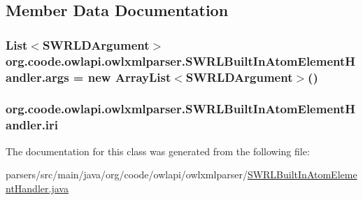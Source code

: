 \subsection{Member Data Documentation}
\hypertarget{classorg_1_1coode_1_1owlapi_1_1owlxmlparser_1_1_s_w_r_l_built_in_atom_element_handler_ac74494af9ceb2e319fe9324276b621ed}{
\subsubsection[{args}]{\setlength{\rightskip}{0pt plus 5cm}List$<${\bf S\-W\-R\-L\-D\-Argument}$>$ org.\-coode.\-owlapi.\-owlxmlparser.\-S\-W\-R\-L\-Built\-In\-Atom\-Element\-Handler.\-args = new Array\-List$<${\bf S\-W\-R\-L\-D\-Argument}$>$()\hspace{0.3cm}{\ttfamily [private]}}}\label{classorg_1_1coode_1_1owlapi_1_1owlxmlparser_1_1_s_w_r_l_built_in_atom_element_handler_ac74494af9ceb2e319fe9324276b621ed}
\hypertarget{classorg_1_1coode_1_1owlapi_1_1owlxmlparser_1_1_s_w_r_l_built_in_atom_element_handler_a6b824f220057039e141f070bd6705e22}{
\subsubsection[{iri}]{ org.\-coode.\-owlapi.\-owlxmlparser.\-S\-W\-R\-L\-Built\-In\-Atom\-Element\-Handler.\-iri\hspace{0.3cm}{\ttfamily [private]}}}\label{classorg_1_1coode_1_1owlapi_1_1owlxmlparser_1_1_s_w_r_l_built_in_atom_element_handler_a6b824f220057039e141f070bd6705e22}


The documentation for this class was generated from the following file\-:\begin{DoxyCompactItemize}
\item 
parsers/src/main/java/org/coode/owlapi/owlxmlparser/\hyperlink{_s_w_r_l_built_in_atom_element_handler_8java}{S\-W\-R\-L\-Built\-In\-Atom\-Element\-Handler.\-java}\end{DoxyCompactItemize}
